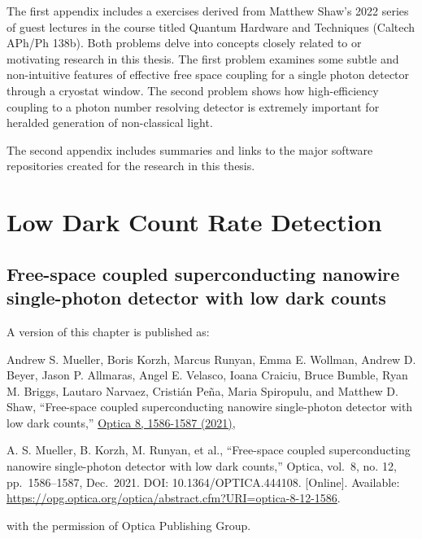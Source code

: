 \documentclass[11pt]{caltech_thesis} %
\begin{document}
The first appendix includes a exercises derived from Matthew Shaw's 2022 series of guest lectures in the course titled Quantum Hardware and Techniques (Caltech APh/Ph 138b). Both problems delve into concepts closely related to or motivating research in this thesis. The first problem examines some subtle and non-intuitive features of effective free space coupling for a single photon detector through a cryostat window. The second problem shows how high-efficiency coupling to a photon number resolving detector is extremely important for heralded generation of non-classical light.

The second appendix includes summaries and links to the major software repositories created for the research in this thesis.

\hypertarget{low-dark-count-rate-detection}{%
\chapter{Low Dark Count Rate Detection}\label{low-dark-count-rate-detection}}

\hypertarget{free-space-coupled-superconducting-nanowire-single-photon-detector-with-low-dark-counts}{%
\section{Free-space coupled superconducting nanowire single-photon detector with low dark counts}\label{free-space-coupled-superconducting-nanowire-single-photon-detector-with-low-dark-counts}}

A version of this chapter is published as:

Andrew S. Mueller, Boris Korzh, Marcus Runyan, Emma E. Wollman, Andrew D. Beyer, Jason P. Allmaras, Angel E. Velasco, Ioana Craiciu, Bruce Bumble, Ryan M. Briggs, Lautaro Narvaez, Cristián Peña, Maria Spiropulu, and Matthew D. Shaw, ``Free-space coupled superconducting nanowire single-photon detector with low dark counts,'' \href{https://opg.optica.org/optica/fulltext.cfm?uri=optica-8-12-1586\&id=465726}{Optica 8, 1586-1587 (2021)},

A. S. Mueller, B. Korzh, M. Runyan, et al., ``Free-space coupled superconducting nanowire single-photon detector with low dark counts,'' Optica, vol.~8, no. 12, pp.~1586--1587, Dec.~2021. DOI: 10.1364/OPTICA.444108. {[}Online{]}. Available: \url{https://opg.optica.org/optica/abstract.cfm?URI=optica-8-12-1586}.

with the permission of Optica Publishing Group.
\end{document}
